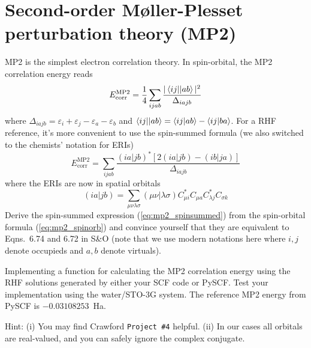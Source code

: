 \documentclass[parskip=full]{article}
\begin{document}
    \section{Second-order M{\o}ller-Plesset perturbation theory (MP2)}

    MP2 is the simplest electron correlation theory.
    In spin-orbital, the MP2 correlation energy reads
    \begin{equation}    \label{eq:mp2_spinorb}
        E_{\textrm{corr}}^{\textrm{MP2}}
            = \frac{1}{4} \sum_{ijab} \frac{|\braket{ij||ab}|^2}{\Delta_{iajb}}
    \end{equation}
    where $\Delta_{iajb} = \varepsilon_i + \varepsilon_j - \varepsilon_a - \varepsilon_b$ and $\braket{ij||ab} = \braket{ij|ab} - \braket{ij|ba}$.
    For a RHF reference, it's more convenient to use the spin-summed formula (we also switched to the chemists' notation for ERIs)
    \begin{equation}    \label{eq:mp2_spinsummed}
        E_{\textrm{corr}}^{\textrm{MP2}}
            = \sum_{ijab} \frac{(ia|jb)^* [2(ia|jb) - (ib|ja)]}{\Delta_{iajb}}
    \end{equation}
    where the ERIs are now in spatial orbitals
    \begin{equation}    \label{eq:eris_xform}
        (ia|jb)
            = \sum_{\mu\nu\lambda\sigma} (\mu\nu|\lambda\sigma) C^*_{\mu i} C_{\mu a} C^*_{\lambda j} C_{\sigma k}
    \end{equation}
    Derive the spin-summed expression (\ref{eq:mp2_spinsummed}) from the spin-orbital formula (\ref{eq:mp2_spinorb}) and convince yourself that they are equivalent to Eqns.~6.74 and 6.72 in S\&O (note that we use modern notations here where $i,j$ denote occupieds and $a,b$ denote virtuals).

    Implementing a function for calculating the MP2 correlation energy using the RHF solutions generated by either your SCF code or PySCF.
    Test your implementation using the water/STO-3G system.
    The reference MP2 energy from PySCF is $-0.03108253$~Ha.

    Hint: (i) You may find Crawford \texttt{Project \#4} helpful.
    (ii) In our cases all orbitals are real-valued, and you can safely ignore the complex conjugate.
\end{document}
